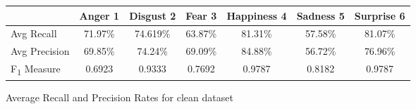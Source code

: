 \begin{figure}[h]
\begin{center}
\caption{Average Recall and Precision Rates for clean dataset}
\begin{tabular}{ | l || c | c | c | c | c | c | }
    \hline
          & Anger 1 & Disgust 2 & Fear 3 & Happiness 4 & Sadness 5 & Surprise 6 \\ \hline \hline
        Avg Recall & 71.97\% & 74.619\% & 63.87\% & 81.31\% & 57.58\% & 81.07\% \\ \hline
        Avg Precision & 69.85\% & 74.24\% & 69.09\%  & 84.88\% & 56.72\% & 76.96\% \\ \hline
        F\textsubscript{1} Measure & 0.6923 & 0.9333 & 0.7692 & 0.9787 & 0.8182 &
        0.9787 \\ \hline
    \end{tabular}
    \label{fig:averageRecall}
\end{center}
\end{figure}
